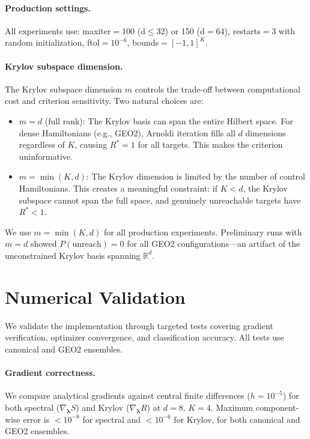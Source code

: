 \documentclass[aps,prx,reprint,superscriptaddress,footnote, twocolumn,notitlepage]{revtex4-2}
\begin{document}
\paragraph{Production settings.}
All experiments use: maxiter$=100$ (d$\leq$32) or 150 (d$=64$), restarts$=3$ with random initialization, ftol$=10^{-6}$, bounds$=[-1,1]^K$.

\paragraph{Krylov subspace dimension.}
The Krylov subspace dimension $m$ controls the trade-off between computational cost
and criterion sensitivity. Two natural choices are:

\begin{itemize}
\item $m = d$ (full rank): The Krylov basis can span the entire Hilbert space.
For dense Hamiltonians (e.g., GEO2), Arnoldi iteration fills all $d$ dimensions regardless
of $K$, causing $R^* = 1$ for all targets. This makes the criterion uninformative.

\item $m = \min(K, d)$: The Krylov dimension is limited by the number of control Hamiltonians.
This creates a meaningful constraint: if $K < d$, the Krylov subspace cannot span the full
space, and genuinely unreachable targets have $R^* < 1$.
\end{itemize}

We use $m = \min(K, d)$ for all production experiments. Preliminary runs with $m = d$
showed $P(\text{unreach}) = 0$ for all GEO2 configurations---an artifact of the unconstrained
Krylov basis spanning $\mathbb{R}^d$.

\section{Numerical Validation}
\label{app:validation}

We validate the implementation through targeted tests covering gradient verification,
optimizer convergence, and classification accuracy. All tests use canonical and GEO2 ensembles.

\paragraph{Gradient correctness.}
We compare analytical gradients against central finite differences ($h = 10^{-5}$)
for both spectral ($\nabla_{\boldsymbol{\lambda}} S$) and Krylov ($\nabla_{\boldsymbol{\lambda}} R$)
at $d = 8$, $K = 4$. Maximum component-wise error is $< 10^{-8}$ for spectral
and $< 10^{-6}$ for Krylov, for both canonical and GEO2 ensembles.
\end{document}
